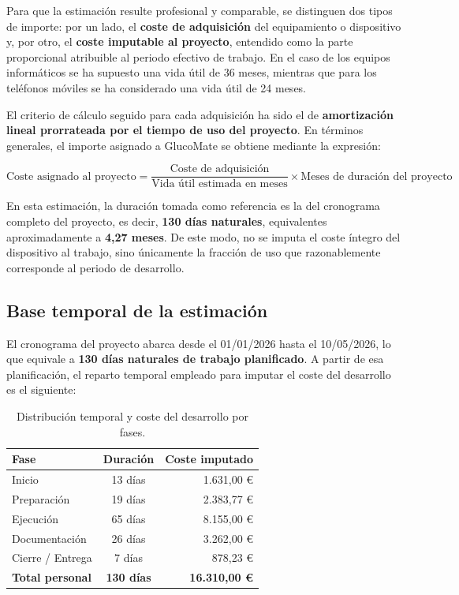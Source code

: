 Para que la estimación resulte profesional y comparable, se distinguen dos tipos de importe:
por un lado, el \textbf{coste de adquisición} del equipamiento o dispositivo y, por otro, el
\textbf{coste imputable al proyecto}, entendido como la parte proporcional atribuible al periodo
 efectivo de trabajo. En el caso de los equipos informáticos se ha supuesto una vida útil de
36 meses, mientras que para los teléfonos móviles se ha considerado una vida útil de 24 meses.

El criterio de cálculo seguido para cada adquisición ha sido el de \textbf{amortización lineal
prorrateada por el tiempo de uso del proyecto}. En términos generales, el importe asignado a
GlucoMate se obtiene mediante la expresión:

\begin{equation}
    \text{Coste asignado al proyecto} = \frac{\text{Coste de adquisición}}{\text{Vida útil estimada en meses}} \times \text{Meses de duración del proyecto}
\end{equation}

En esta estimación, la duración tomada como referencia es la del cronograma completo del
proyecto, es decir, \textbf{130 días naturales}, equivalentes aproximadamente a
\textbf{4,27 meses}. De este modo, no se imputa el coste íntegro del dispositivo al trabajo,
sino únicamente la fracción de uso que razonablemente corresponde al periodo de desarrollo.

\subsection{Base temporal de la estimación}

El cronograma del proyecto abarca desde el 01/01/2026 hasta el 10/05/2026, lo que equivale a
\textbf{130 días naturales de trabajo planificado}. A partir de esa planificación, el reparto
temporal empleado para imputar el coste del desarrollo es el siguiente:

\begin{table}[H]
    \centering
    \caption{Distribución temporal y coste del desarrollo por fases.}
    \label{tab:coste-fases}
    \begin{tabular}{|p{4.2cm}|c|r|}
        \hline
        \textbf{Fase} & \textbf{Duración} & \textbf{Coste imputado} \\
        \hline
        Inicio & 13 días & 1.631,00 \euro{} \\
        \hline
        Preparación & 19 días & 2.383,77 \euro{} \\
        \hline
        Ejecución & 65 días & 8.155,00 \euro{} \\
        \hline
        Documentación & 26 días & 3.262,00 \euro{} \\
        \hline
        Cierre / Entrega & 7 días & 878,23 \euro{} \\
        \hline
        \textbf{Total personal} & \textbf{130 días} & \textbf{16.310,00 \euro{}} \\
        \hline
    \end{tabular}
\end{table}

